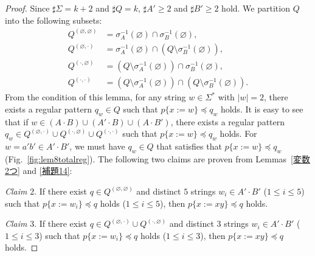 \begin{proof}
Since $\sharp \Sigma = k + 2$ and $\sharp Q = k$, $\sharp A' \geq 2$ and $\sharp B' \geq 2$ hold.
We partition $Q$ into the following subsets:
\begin{align*}
  Q^{(\varnothing,\varnothing)} & = \sigma_{A}^{-1}(\varnothing) \cap \sigma_{B}^{-1}(\varnothing),\\
  Q^{(\varnothing,\cdot)} & = \sigma_{A}^{-1}(\varnothing) \cap (Q\setminus \sigma_{B}^{-1}(\varnothing)),\\
  Q^{(\cdot,\varnothing)} & = (Q\setminus \sigma_{A}^{-1}(\varnothing)) \cap \sigma_{B}^{-1}(\varnothing),\\
  Q^{(\cdot,\cdot)} & = (Q\setminus \sigma_{A}^{-1}(\varnothing)) \cap (Q\setminus \sigma_{B}^{-1}(\varnothing)).
\end{align*}
From the condition of this lemma, for any string $w \in \Sigma^{\ast}$ with $|w|=2$, there exists a regular pattern $q_{w} \in Q$ such that $p \{ x:=w \} \preceq q_{w}$ holds.
It is easy to see that if $w \in (A\cdot B) \cup (A'\cdot B) \cup (A\cdot B')$, there exists a regular pattern $q_{w} \in Q^{(\varnothing,\cdot)} \cup Q^{(\cdot,\varnothing)} \cup Q^{(\cdot,\cdot)}$ such that $p \{ x:=w \} \preceq q_{w}$ holds.
For $w=a'b'\in A'\cdot B'$, we must have $q_{w} \in Q$ that satisfies that $p \{ x:=w \} \preceq q_{w}$ (Fig.~\ref{fig:lem8totalreg}).
The following two claims are proven from Lemmas~\ref{変数2つ} and \ref{補題14}:

\smallskip

\noindent
\textit{Claim} 2. If there exist $q \in Q^{(\varnothing,\varnothing)}$ and distinct $5$ strings $w_{i} \in A'\cdot B'$ ($1\leq i\leq 5$) such  that $p \{ x:=w_{i} \} \preceq q$ holds ($1\leq i\leq 5$),  then $p \{ x:=xy \} \preceq q$ holds.

\smallskip

\noindent
\textit{Claim} 3. If there exist $q \in Q^{(\varnothing,\cdot)} \cup Q^{(\cdot,\varnothing)}$ and distinct $3$ strings $w_{i} \in A'\cdot B'$ ($1\leq i\leq 3$) such that $p \{ x:=w_{i} \} \preceq q$ holds ($1\leq i\leq 3$),  then $p \{ x:=xy \} \preceq q$ holds.


\end{proof}
